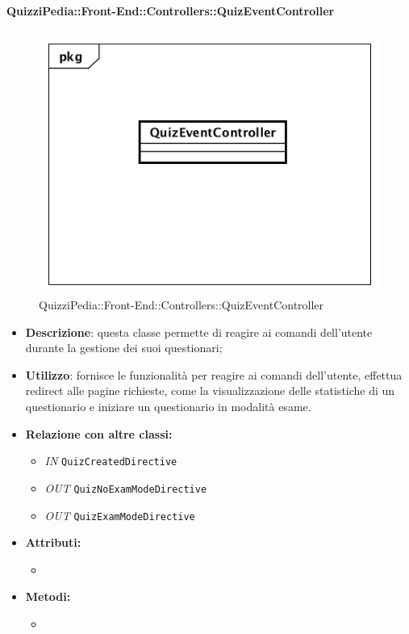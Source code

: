 \paragraph{QuizziPedia::Front-End::Controllers::QuizEventController}
\begin{figure}
	\centering
	\includegraphics[scale=0.45]{UML/Classi/Front-End/QuizziPedia_Front-end_Controller_QuizEventController.png}
	\caption{QuizziPedia::Front-End::Controllers::QuizEventController}
\end{figure}
\begin{itemize}
	\item \textbf{Descrizione}: questa classe permette di reagire ai comandi dell'utente durante la gestione dei suoi questionari;
	\item \textbf{Utilizzo}: fornisce le funzionalità per reagire ai comandi dell'utente, effettua redirect alle pagine richieste, come la visualizzazione delle statistiche di un questionario e iniziare un questionario in modalità esame.
	\item \textbf{Relazione con altre classi:}
	\begin{itemize}
		\item \textit{IN} \texttt{QuizCreatedDirective} 
		\item \textit{OUT} \texttt{QuizNoExamModeDirective} 
		\item \textit{OUT} \texttt{QuizExamModeDirective} 
	\end{itemize}
	\item \textbf{Attributi:}
	\begin{itemize}
		\item 
	\end{itemize}
	\item \textbf{Metodi:}
	\begin{itemize}
		\item 
	\end{itemize}
\end{itemize}